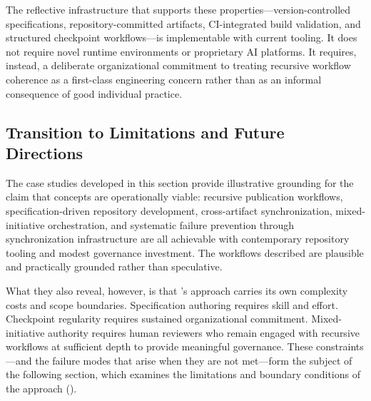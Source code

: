 The reflective infrastructure that supports these properties---version-controlled specifications, repository-committed artifacts, CI-integrated build validation, and structured checkpoint workflows---is implementable with current tooling. It does not require novel runtime environments or proprietary AI platforms. It requires, instead, a deliberate organizational commitment to treating recursive workflow coherence as a first-class engineering concern rather than as an informal consequence of good individual practice.

\subsection{Transition to Limitations and Future Directions}

The case studies developed in this section provide illustrative grounding for the claim that  concepts are operationally viable: recursive publication workflows, specification-driven repository development, cross-artifact synchronization, mixed-initiative orchestration, and systematic failure prevention through synchronization infrastructure are all achievable with contemporary repository tooling and modest governance investment. The workflows described are plausible and practically grounded rather than speculative.

What they also reveal, however, is that 's approach carries its own complexity costs and scope boundaries. Specification authoring requires skill and effort. Checkpoint regularity requires sustained organizational commitment. Mixed-initiative authority requires human reviewers who remain engaged with recursive workflows at sufficient depth to provide meaningful governance. These constraints---and the failure modes that arise when they are not met---form the subject of the following section, which examines the limitations and boundary conditions of the  approach \cite{Brooks1987NoSilverBullet} ().
